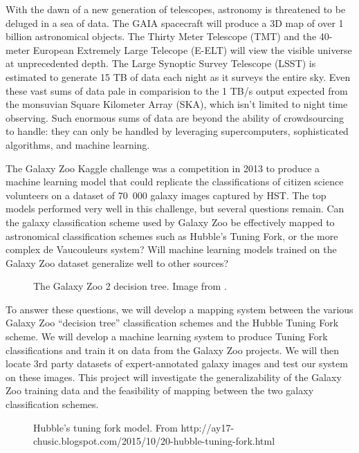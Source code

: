 \documentclass[twocolumn]{aastex6}
\begin{document}
With the dawn of a new generation of telescopes, astronomy is threatened to be deluged in a sea of data. The GAIA spacecraft will produce a 3D map of over 1 billion astronomical objects. The Thirty Meter Telescope (TMT) and the 40-meter European Extremely Large Telecope (E-ELT) will view the visible universe at unprecedented depth. The Large Synoptic Survey Telescope (LSST) is estimated to generate 15 TB of data each night as it surveys the entire sky. Even these vast sums of data pale in comparision to the 1 TB/s output expected from the monsuvian Square Kilometer Array (SKA), which isn't limited to night time observing. Such enormous sums of data are beyond the ability of crowdsourcing to handle: they can only be handled by leveraging supercomputers, sophisticated algorithms, and machine learning.

The Galaxy Zoo Kaggle challenge was a competition in 2013 to produce a machine learning model that could replicate the classifications of citizen science volunteers on a dataset of 70 000 galaxy images captured by HST. The top models performed very well in this challenge, but several questions remain. Can the galaxy classification scheme used by Galaxy Zoo be effectively mapped to astronomical classification schemes such as Hubble's Tuning Fork, or the more complex de Vaucouleurs system? Will machine learning models trained on the Galaxy Zoo dataset generalize well to other sources? 

\begin{figure}[!b]
\caption{The Galaxy Zoo 2 decision tree. Image from \cite{2013MNRAS.435.2835W}.}
\label{fig:GZ2tree}
\end{figure}

To answer these questions, we will develop a mapping system between the various Galaxy Zoo “decision tree” classification schemes and the Hubble Tuning Fork scheme. We will develop a machine learning system to produce Tuning Fork classifications and train it on data from the Galaxy Zoo projects. We will then locate 3rd party datasets of expert-annotated galaxy images and test our system on these images. This project will investigate the generalizability of the Galaxy Zoo training data and the feasibility of mapping between the two galaxy classification schemes. 

\begin{figure}[!t]
\caption{Hubble's tuning fork model. From http://ay17-chusic.blogspot.com/2015/10/20-hubble-tuning-fork.html}
\label{fig:tuningFork}
\end{figure}
\end{document}
